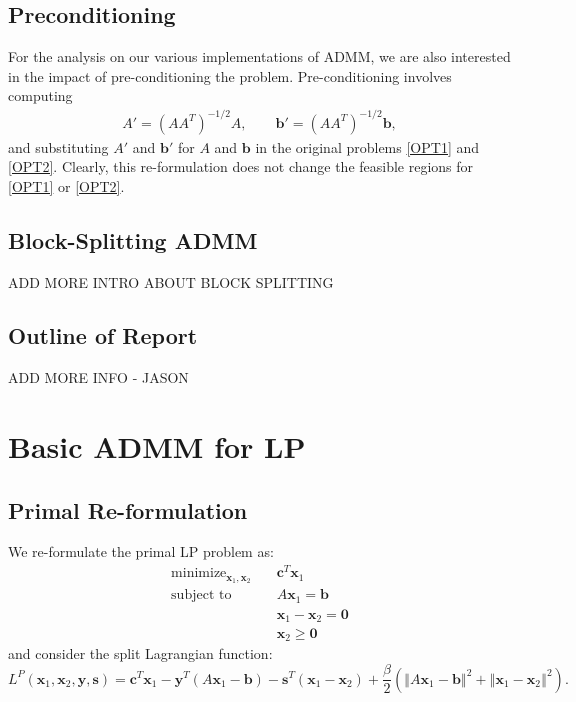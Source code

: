 \documentclass{article}
\begin{document}
\vspace{0.1in}
\subsection*{Preconditioning}
For the analysis on our various implementations of ADMM, we are also interested in the impact of pre-conditioning the problem. Pre-conditioning involves computing 
\begin{align}
A' = (AA^T )^{-1/2}A , \quad \quad \mathbf{b}' =(AA^T )^{-1/2}\mathbf{b},
\end{align}
and substituting $A'$ and $\mathbf{b}'$ for $A$ and $\mathbf{b}$ in the original problems \eqref{OPT1} and \eqref{OPT2}. Clearly, this re-formulation does not change the feasible regions for  \eqref{OPT1} or \eqref{OPT2}. 

\vspace{0.1in}
\vspace{0.1in}
\subsection*{Block-Splitting ADMM}
{\color{red} ADD MORE INTRO ABOUT BLOCK SPLITTING}

\vspace{0.1in}
\vspace{0.1in}
\subsection*{Outline of Report}
{\color{red} ADD MORE INFO - JASON}

\vspace{0.5in}
\section{Basic ADMM for LP}
\vspace{0.1in}
\subsection*{Primal Re-formulation}
We re-formulate the primal LP problem as:
\begin{align}
\text{minimize}_{ \mathbf{x}_{1}, \mathbf{x}_{2}} &\quad \mathbf{c}^T\mathbf{x}_1 \tag{OPT3}\label{OPT3} \\
\text{subject to  \ \  } &\quad  A \mathbf{x}_{1} = \mathbf{b}  \nonumber \\
&\quad \mathbf{x}_{1}  - \mathbf{x}_{2} = \mathbf{0}  \nonumber \\
&\quad \mathbf{x}_{2} \geq \mathbf{0} \nonumber 
\end{align}
and consider the split Lagrangian function:
\[
L^{P}(\mathbf{x}_{1},\mathbf{x}_{2},\mathbf{y} ,\mathbf{s})=\mathbf{c}^{T}\mathbf{x}_{1}-\mathbf{y}^{T}\left(A\mathbf{x}_{1}-\mathbf{b}\right)-\mathbf{s}^{T}\left(\mathbf{x}_{1}-\mathbf{x}_{2}\right)+\frac{\beta}{2}\left(\left\Vert A\mathbf{x}_{1}-\mathbf{b}\right\Vert ^{2}+\left\Vert \mathbf{x}_{1}-\mathbf{x}_{2}\right\Vert ^{2}\right).
\]
\end{document}

